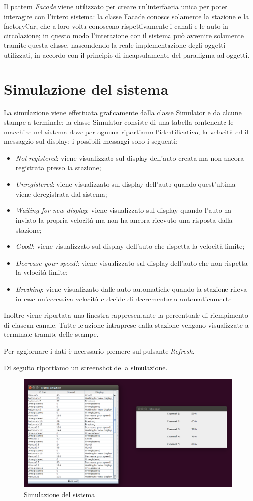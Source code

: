 \documentclass[a4paper,10pt]{article}
\begin{document}
Il pattern \textit{Facade} viene utilizzato per creare un'interfaccia unica per poter interagire con l'intero sistema: la classe Facade conosce solamente la stazione e la factoryCar, che a loro volta conoscono rispettivamente i canali e le auto in circolazione; in questo modo l'interazione con il sistema può avvenire solamente tramite questa classe, nascondendo la reale implementazione degli oggetti utilizzati, in accordo con il principio di incapsulamento del paradigma ad oggetti.

\section{Simulazione del sistema}

La simulazione viene effettuata graficamente dalla classe Simulator e da alcune stampe a terminale: la classe Simulator consiste di una tabella contenente le macchine nel sistema dove per ognuna riportiamo l'identificativo, la velocità ed il messaggio sul display; i possibili messaggi sono i seguenti:
\begin{itemize}
\item \textit{Not registered}: viene visualizzato sul display dell'auto creata ma non ancora registrata presso la stazione;
\item \textit{Unregistered}: viene visualizzato sul display dell'auto quando quest'ultima viene deregistrata dal sistema;
\item \textit{Waiting for new display}: viene visualizzato sul display quando l'auto ha inviato la propria velocità ma non ha ancora ricevuto una risposta dalla stazione;
\item \textit{Good!}: viene visualizzato sul display dell'auto che rispetta la velocità limite;
\item \textit{Decrease your speed!}:  viene visualizzato sul display dell'auto che non rispetta la velocità limite;
\item \textit{Breaking}: viene visualizzato dalle auto automatiche quando la stazione rileva in esse un'eccessiva velocità e decide di decrementarla automaticamente. 
\end{itemize}

Inoltre viene riportata una finestra rappresentante la percentuale di riempimento di ciascun canale. Tutte le azione intraprese dalla stazione vengono visualizzate a terminale tramite delle stampe.

Per aggiornare i dati è necessario premere sul pulsante \textit{Refresh}.

Di seguito riportiamo un screenshot della simulazione.

\begin{figure}[htbp]
\includegraphics[scale=0.32]{screenshot.png}
\caption{Simulazione del sistema}
\label{screenshot}
\end{figure}
\end{document}
